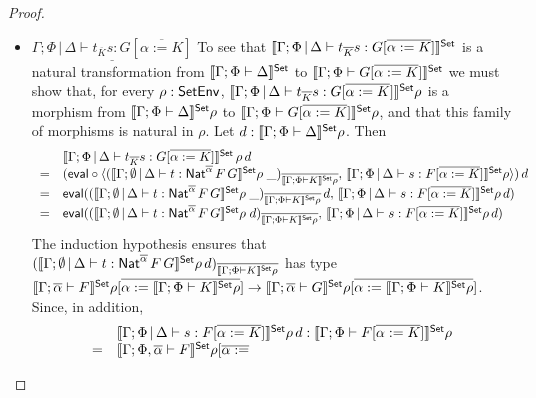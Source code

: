 \documentclass[runningheads]{llncs}
\begin{document}
\begin{proof}
\begin{itemize}
\item 
$\underline{\Gamma;\Phi \,|\, \Delta \vdash t_{\overline K} s: G
  [\overline{\alpha := K}]}$\; 
  To see that $\llbracket{\Gamma;\Phi \,|\,
  \Delta \vdash t_{\overline K} s: G [\overline{\alpha := K}]}\rrbracket^{\mathsf{Set}}$ is a
  natural transformation from $\llbracket{\Gamma; \Phi \vdash \Delta}\rrbracket^{\mathsf{Set}}$ to
  $\llbracket{\Gamma;\Phi \vdash G [\overline{\alpha := K}]}\rrbracket^{\mathsf{Set}}$ we must
  show that, for every $\rho : \mathsf{SetEnv}$, $\llbracket{\Gamma;\Phi \,|\,
    \Delta \vdash t_{\overline K} s: G [\overline{\alpha := K}]}\rrbracket^{\mathsf{Set}}\rho$
  is a morphism from $\llbracket{\Gamma; \Phi \vdash \Delta}\rrbracket^{\mathsf{Set}}\rho$ to
  $\llbracket{\Gamma;\Phi \vdash G [\overline{\alpha := K}]}\rrbracket^{\mathsf{Set}}\rho$, and
  that this family of morphisms is natural in $\rho$. Let $d :
  \llbracket{\Gamma; \Phi \vdash \Delta}\rrbracket^{\mathsf{Set}}\rho$. Then
  \[\begin{array}{ll}
  & \llbracket{\Gamma;\Phi \,|\, \Delta \vdash t_{\overline K} s: G
  [\overline{\alpha := K}]}\rrbracket^{\mathsf{Set}}\,\rho\,d\\
= & (\mathsf{eval} \circ \langle (\llbracket{\Gamma; \emptyset \,|\, \Delta \vdash
  t : \mathsf{Nat}^{\overline{\alpha}} \,F \,G}\rrbracket^{\mathsf{Set}}\rho\;
\_)_{\overline{\llbracket{\Gamma;\Phi \vdash K}\rrbracket^{\mathsf{Set}}\rho}},\,
\llbracket{\Gamma;\Phi \,|\, \Delta \vdash s: F [\overline{\alpha :=
      K}]}\rrbracket^{\mathsf{Set}}\rho \rangle)\,d\\
= & \mathsf{eval} ((\llbracket{\Gamma; \emptyset \,|\, \Delta \vdash t :
  \mathsf{Nat}^{\overline{\alpha}} \,F \,G}\rrbracket^{\mathsf{Set}}\rho\;
\_)_{\overline{\llbracket{\Gamma;\Phi \vdash K}\rrbracket^{\mathsf{Set}}\rho}} \,d,\,
\llbracket{\Gamma;\Phi \,|\, \Delta \vdash s: F [\overline{\alpha :=
      K}]}\rrbracket^{\mathsf{Set}}\rho\, d)\\
= & \mathsf{eval} ((\llbracket{\Gamma; \emptyset \,|\, \Delta \vdash t :
  \mathsf{Nat}^{\overline{\alpha}} \,F \,G}\rrbracket^{\mathsf{Set}}\rho\;
d)_{\overline{\llbracket{\Gamma;\Phi \vdash K}\rrbracket^{\mathsf{Set}}\rho}},\,
\llbracket{\Gamma;\Phi \,|\, \Delta \vdash s: F [\overline{\alpha :=
      K}]}\rrbracket^{\mathsf{Set}}\rho\, d)\\
\end{array}\]
The induction hypothesis ensures that $(\llbracket{\Gamma; \emptyset \,|\,
  \Delta \vdash t : \mathsf{Nat}^{\overline{\alpha}} \,F \,G}\rrbracket^{\mathsf{Set}}\rho\,
d)_{\overline{\llbracket{\Gamma;\Phi \vdash K}\rrbracket^{\mathsf{Set}}\rho}}$ has type
$\llbracket{\Gamma; \overline{\alpha} \vdash F}\rrbracket^{\mathsf{Set}}\rho[\overline{\alpha :=
    \llbracket{\Gamma;\Phi \vdash K}\rrbracket^{\mathsf{Set}}\rho}] \to \llbracket{\Gamma;
  \overline{\alpha} \vdash G}\rrbracket^{\mathsf{Set}}\rho[\overline{\alpha := \llbracket{\Gamma;\Phi \vdash
      K}\rrbracket^{\mathsf{Set}}\rho}]$.  Since, in addition, 
\[\begin{array}{ll}
  &\llbracket{\Gamma;\Phi \,|\,
  \Delta \vdash s: F [\overline{\alpha := K}]}\rrbracket^{\mathsf{Set}}\rho\, d :
\llbracket{\Gamma; \Phi \vdash F[\overline{\alpha := K}]}\rrbracket^{\mathsf{Set}}\rho \\ 
  =&\llbracket{\Gamma; \Phi, \overline{\alpha} \vdash F}\rrbracket^{\mathsf{Set}}\rho[\overline{\alpha :=
}
\end{array}\]
\end{itemize}
\end{proof}
\end{document}
